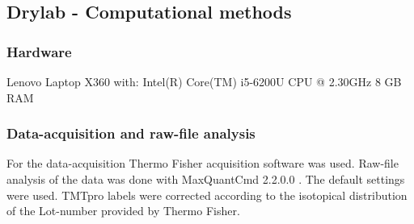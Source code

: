 \documentclass[
  11pt,
]{article}
\let\origfigure\figure
\begin{document}
\hypertarget{drylab---computational-methods}{%
\subsection{Drylab - Computational
methods}\label{drylab---computational-methods}}

\hypertarget{hardware}{%
\subsubsection{Hardware}\label{hardware}}

Lenovo Laptop X360 with: Intel(R) Core(TM) i5-6200U CPU @ 2.30GHz 8 GB
RAM

\hypertarget{data-acquisition-and-raw-file-analysis}{%
\subsubsection{Data-acquisition and raw-file
analysis}\label{data-acquisition-and-raw-file-analysis}}

For the data-acquisition Thermo Fisher acquisition software was used.
Raw-file analysis of the data was done with MaxQuantCmd 2.2.0.0
\citep{Cox2008}. The default settings were used. TMTpro labels were
corrected according to the isotopical distribution of the Lot-number
provided by Thermo Fisher.

\bgroup  \origfigure[H] 
\end{document}

